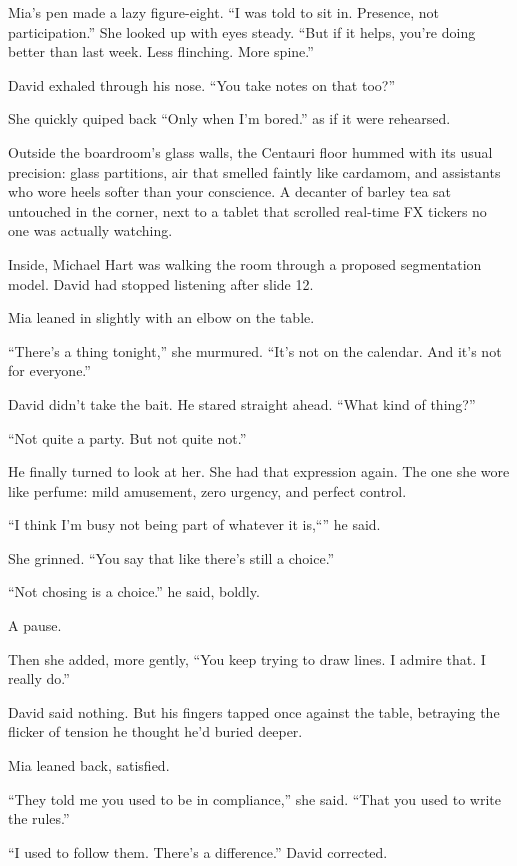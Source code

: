 Mia’s pen made a lazy figure-eight. ``I was told to sit in. Presence, not participation.'' She looked up  
with eyes steady. ``But if it helps, you’re doing better than last week. Less flinching. More spine.''

David exhaled through his nose. ``You take notes on that too?''

She quickly quiped back ``Only when I’m bored.'' as if it were rehearsed.

Outside the boardroom’s glass walls, the Centauri floor hummed with its usual precision: glass partitions, air 
that smelled faintly like cardamom, and assistants who wore heels softer than your conscience. A decanter of barley 
tea sat untouched in the corner, next to a tablet that scrolled real-time FX tickers no one was actually watching.

Inside, Michael Hart was walking the room through a proposed segmentation model. David had stopped listening 
after slide 12.

Mia leaned in slightly with an elbow on the table.

``There’s a thing tonight,'' she murmured. ``It's not on the calendar. And it's not for everyone.''

David didn’t take the bait. He stared straight ahead. ``What kind of thing?''

``Not quite a party. But not quite not.''

He finally turned to look at her. She had that expression again. The one she wore like perfume: mild amusement, 
zero urgency, and perfect control.

``I think I’m busy not being part of whatever it is,``'' he said.

She grinned. ``You say that like there’s still a choice.''

``Not chosing is a choice.'' he said, boldly.

A pause.

Then she added, more gently, ``You keep trying to draw lines. I admire that. I really do.''

David said nothing. But his fingers tapped once against the table, betraying the flicker of tension he thought 
he’d buried deeper.

Mia leaned back, satisfied.

``They told me you used to be in compliance,'' she said. ``That you used to write the rules.''

``I used to follow them. There's a difference.'' David corrected.

